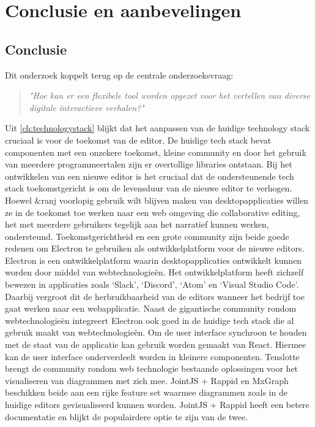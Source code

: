 \chapter{Conclusie en aanbevelingen}
\section{Conclusie}
\label{sec:conclusion}
Dit onderzoek koppelt terug op de centrale onderzoeksvraag: 
\begin{quote} 
    \centering
    \large
    \textit{
        "Hoe kan er een flexibele tool worden opgezet voor het vertellen van diverse digitale interactieve verhalen?"
    }
\end{quote}

Uit \autoref{ch:technologystack} blijkt dat het aanpassen van de huidige technology stack cruciaal is voor de toekomst van de editor. De huidige tech stack bevat componenten met een onzekere toekomst, kleine community en door het gebruik van meerdere programmeertalen zijn er overtollige libraries ontstaan. Bij het ontwikkelen van een nieuwe editor is het cruciaal dat de ondersteunende tech stack toekomstgericht is om de levensduur van de nieuwe editor te verhogen. Hoewel \&ranj voorlopig gebruik wilt blijven maken van desktopapplicaties willen ze in de toekomst toe werken naar een web omgeving die collaborative editing, het met meerdere gebruikers tegelijk aan het narratief kunnen werken, ondersteund. Toekomstgerichtheid en een grote community zijn beide goede redenen om Electron te gebruiken als ontwikkelplatform voor de nieuwe editors. Electron is een ontwikkelplatform waarin desktopapplicaties ontwikkelt kunnen worden door middel van webtechnologieën. Het ontwikkelplatform heeft zichzelf bewezen in applicaties zoals ‘Slack’, ‘Discord’, ‘Atom’ en ‘Visual Studio Code’. Daarbij vergroot dit de herbruikbaarheid van de editors wanneer het bedrijf toe gaat werken naar een webapplicatie. Naast de gigantische community rondom webtechnologieën integreert Electron ook goed in de huidige tech stack die al gebruik maakt van webtechnologieën. Om de user interface synchroon te houden met de staat van de applicatie kan gebruik worden gemaakt van React. Hiermee kan de user interface onderverdeelt worden in kleinere componenten. Tenslotte brengt de community rondom web technologie bestaande oplossingen voor het visualiseren van diagrammen met zich mee. JointJS + Rappid en MxGraph beschikken beide aan een rijke feature set waarmee diagrammen zoals in de huidige editors gevisualiseerd kunnen worden. JointJS + Rappid heeft een betere documentatie en blijkt de populairdere optie te zijn van de twee. 

